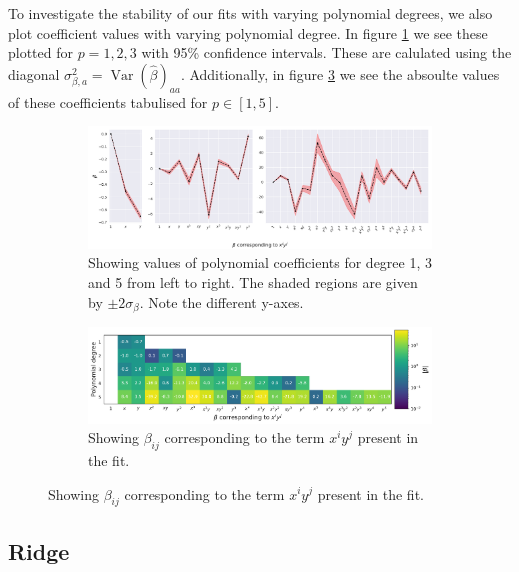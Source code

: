 \documentclass[twocolumn,english,notitlepage]{article}
\renewcommand{\var}{\operatorname{Var}}
\begin{document}
    To investigate the stability of our fits with varying polynomial degrees, we also plot coefficient values with varying polynomial degree. In figure \ref{fig:res:OLS_beta_values_plot} we see these plotted for $p = 1,2,3$ with 95\% confidence intervals. These are calulated using the diagonal $\sigma^2_{\beta,a} = \var{(\hat{\beta})_{aa}}$. Additionally, in figure \ref{fig:res:OLS_beta_values_table} we see the absoulte values of these coefficients tabulised for $p \in [1,5]$.

    \begin{figure}
        \begin{subfigure}{\textwidth}
            \centering
            \includegraphics[width=\linewidth]{linreg_coefs_plots.pdf}
            \caption{Showing values of polynomial coefficients for degree 1, 3 and 5 from left to right. The shaded regions are given by $\pm 2\sigma_\beta$. Note the different y-axes.} 
            \label{fig:res:OLS_beta_values_plot}
        \end{subfigure}
        \begin{subfigure}{\textwidth}
            \centering
            \includegraphics[width=\linewidth]{linreg_coefs_table.pdf}
            \caption{Showing $\beta_{ij}$ corresponding to the term $x^i y^j$ present in the fit.}
            \label{fig:res:OLS_beta_values_table}    
        \end{subfigure}
    \end{figure}

    \subsection{Ridge}
\end{document}
